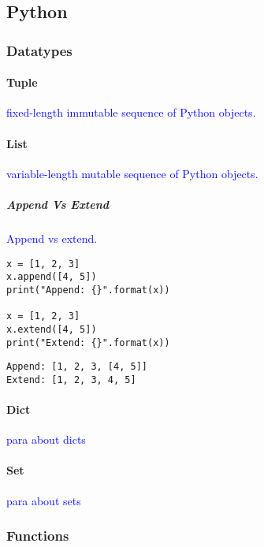 \subsection{Python}

\subsubsection{Datatypes}

\paragraph{Tuple}

\textcolor{blue}{fixed-length immutable sequence of Python objects.}

\paragraph{List}

\textcolor{blue}{variable-length mutable sequence of Python objects.}

\subparagraph{Append Vs Extend}

\textcolor{blue}{Append vs extend.}

\begin{lstlisting}[style=pyInStyle]
x = [1, 2, 3]
x.append([4, 5])
print("Append: {}".format(x))

x = [1, 2, 3]
x.extend([4, 5])
print("Extend: {}".format(x))
\end{lstlisting}
\begin{lstlisting}[style=pyOutStyle]
Append: [1, 2, 3, [4, 5]]
Extend: [1, 2, 3, 4, 5]
\end{lstlisting}


\paragraph{Dict}

\textcolor{blue}{para about dicts}

\paragraph{Set}

\textcolor{blue}{para about sets}

\subsubsection{Functions}

